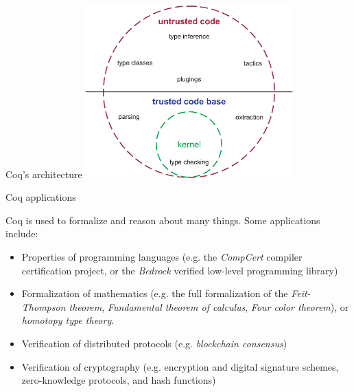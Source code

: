 \documentclass[10pt]{beamer}
\begin{document}
\begin{frame}{Coq's architecture}
    \includegraphics[width=8cm]{pictures/circ.eps}
    \vfill
    {\hfill\cite{SozeauPic}}
\end{frame}

\begin{frame}{Coq applications}

Coq is used to formalize and reason about many things. Some  applications include:

\begin{itemize}
    \item Properties of programming languages (e.g. the \emph{CompCert} compiler certification project, or the \emph{Bedrock} verified low-level programming library)
    \item Formalization of mathematics (e.g. the full formalization of the \textit{Feit-Thompson theorem}, \textit{Fundamental theorem of calculus}, \textit{Four color theorem}), or \textit{homotopy type theory}.
    \item Verification of distributed protocols (e.g. \textit{blockchain consensus})
    \item Verification of cryptography (e.g. encryption and digital signature schemes, zero-knowledge protocols, and hash functions)
\end{itemize}

\end{frame}
\end{document}
